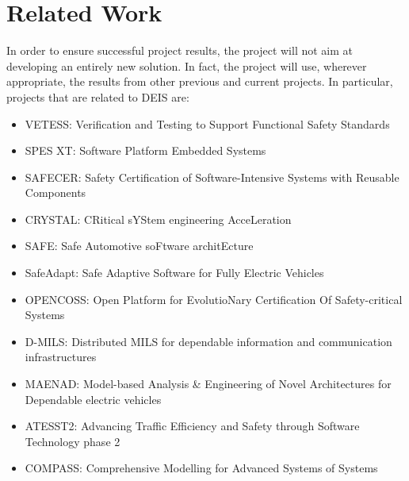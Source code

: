 \section{Related Work}
In order to ensure successful project results, the project will not aim at developing an entirely new solution. In fact, the project will use, wherever appropriate, the results from other previous and current projects. In particular, projects that are related to DEIS are: 
\begin{itemize}
	\item VETESS: Verification and Testing to Support Functional Safety Standards
	\item SPES XT: Software Platform Embedded Systems
	\item SAFECER: Safety Certification of Software-Intensive Systems with Reusable Components
	\item CRYSTAL: CRitical sYStem engineering AcceLeration
	\item SAFE: Safe Automotive soFtware architEcture
	\item SafeAdapt: Safe Adaptive Software for Fully Electric Vehicles
	\item OPENCOSS: Open Platform for EvolutioNary Certification Of Safety-critical Systems 
	\item D-MILS: Distributed MILS for dependable information and communication infrastructures
	\item MAENAD: Model-based Analysis \& Engineering of Novel Architectures for Dependable electric vehicles
	\item ATESST2: Advancing Traffic Efficiency and Safety through Software Technology phase 2
	\item COMPASS: Comprehensive Modelling for Advanced Systems of Systems
\end{itemize}